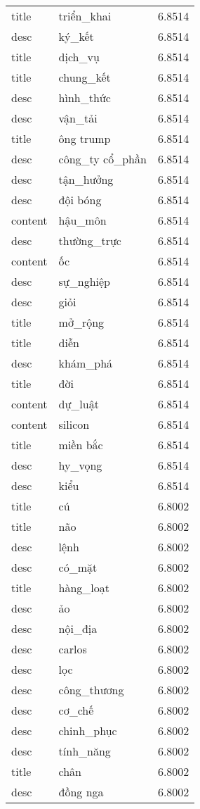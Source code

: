 \documentclass{article}
\begin{document}
\begin{tabular}{lll}
title & triển\_khai & 6.8514\\
desc & ký\_kết & 6.8514\\
title & dịch\_vụ & 6.8514\\
title & chung\_kết & 6.8514\\
desc & hình\_thức & 6.8514\\
desc & vận\_tải & 6.8514\\
title & ông trump & 6.8514\\
desc & công\_ty cổ\_phần & 6.8514\\
desc & tận\_hưởng & 6.8514\\
desc & đội bóng & 6.8514\\
content & hậu\_môn & 6.8514\\
desc & thường\_trực & 6.8514\\
content & ốc & 6.8514\\
desc & sự\_nghiệp & 6.8514\\
desc & giỏi & 6.8514\\
title & mở\_rộng & 6.8514\\
title & diễn & 6.8514\\
desc & khám\_phá & 6.8514\\
title & đời & 6.8514\\
content & dự\_luật & 6.8514\\
content & silicon & 6.8514\\
title & miền bắc & 6.8514\\
desc & hy\_vọng & 6.8514\\
desc & kiểu & 6.8514\\
title & cú & 6.8002\\
title & não & 6.8002\\
desc & lệnh & 6.8002\\
desc & có\_mặt & 6.8002\\
title & hàng\_loạt & 6.8002\\
desc & ảo & 6.8002\\
desc & nội\_địa & 6.8002\\
desc & carlos & 6.8002\\
desc & lọc & 6.8002\\
desc & công\_thương & 6.8002\\
desc & cơ\_chế & 6.8002\\
desc & chinh\_phục & 6.8002\\
desc & tính\_năng & 6.8002\\
title & chân & 6.8002\\
desc & đồng nga & 6.8002\\

\end{tabular}
\end{document}
